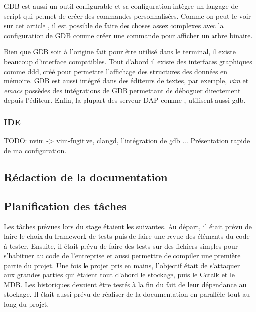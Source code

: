 \documentclass[a4paper]{article}
\begin{document}
GDB est aussi un outil configurable et sa configuration intègre un langage de
script qui permet de créer des commandes personnalisées. Comme on peut le voir
sur cet article \cite{gdbinit}, il est possible de faire des choses assez
complexes avec la configuration de GDB comme créer une commande pour afficher un
arbre binaire.

Bien que GDB soit à l'origine fait pour être utilisé dans le terminal, il existe
beaucoup d'interface compatibles. Tout d'abord il existe des interfaces
graphiques comme ddd, créé pour permettre l'affichage des structures des données
en mémoire. GDB est aussi intégré dans des éditeurs de textes, par exemple,
\textit{vim} et \textit{emacs} possèdes des intégrations de GDB permettant de
déboguer directement depuis l'éditeur. Enfin, la plupart des serveur DAP
comme , utilisent aussi gdb.
\subsubsection{IDE}%

TODO: nvim -> vim-fugitive, clangd, l'intégration de gdb ... Présentation rapide
de ma configuration.
\subsection{Rédaction de la documentation}%
\clearpage
\subsection{Planification des tâches}%

Les tâches prévues lors du stage étaient les suivantes. Au départ, il était
prévu de faire le choix du framework de tests puis de faire une revue des
éléments du code à tester. Ensuite, il était prévu de faire des tests sur des
fichiers simples pour s'habituer au code de l'entreprise et aussi permettre de
compiler une première partie du projet. Une fois le projet pris en mains,
l'objectif était de s'attaquer aux grandes parties qui étaient tout d'abord le
stockage, puis le Cctalk et le MDB. Les historiques devaient être testés à la
fin du fait de leur dépendance au stockage. Il était aussi prévu de réaliser de
la documentation en parallèle tout au long du projet.
\end{document}
